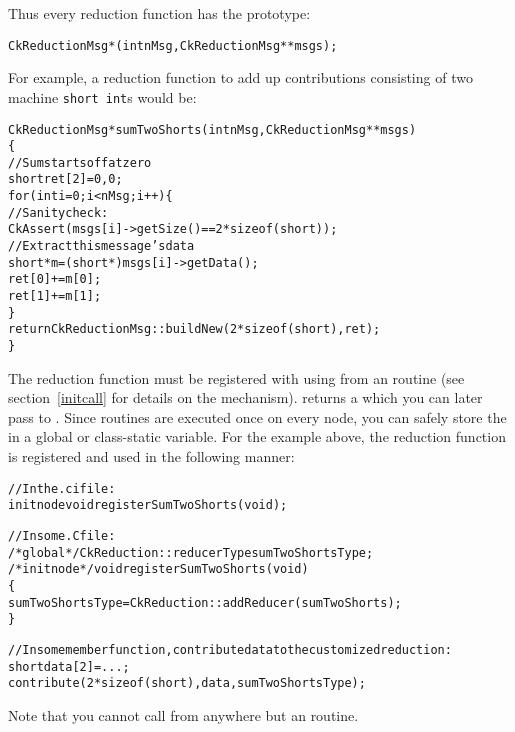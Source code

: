 Thus every reduction function has the prototype:
\begin{alltt}
CkReductionMsg *(int nMsg,CkReductionMsg **msgs);
\end{alltt}

For example, a reduction function to add up contributions 
consisting of two machine {\tt short int}s would be:

\begin{alltt}
CkReductionMsg *sumTwoShorts(int nMsg,CkReductionMsg **msgs)
\{
  //Sum starts off at zero
  short ret[2]={0,0};
  for (int i=0;i<nMsg;i++) \{
    //Sanity check:
    CkAssert(msgs[i]->getSize()==2*sizeof(short));
    //Extract this message's data
    short *m=(short *)msgs[i]->getData();
    ret[0]+=m[0];
    ret[1]+=m[1];
  \}
  return CkReductionMsg::buildNew(2*sizeof(short),ret);
\}
\end{alltt}

The reduction function must be registered with \charmpp{} 
using  from
an  routine (see section~\ref{initcall} for details
on the  mechanism).   
returns a  which you can later 
pass to .  Since  routines are executed
once on every node, you can safely store the 
in a global or class-static variable.  For the example above, the reduction
function is registered and used in the following manner:

\begin{alltt}
//In the .ci file:
  initnode void registerSumTwoShorts(void);

//In some .C file:
/*global*/ CkReduction::reducerType sumTwoShortsType;
/*initnode*/ void registerSumTwoShorts(void)
\{
  sumTwoShortsType=CkReduction::addReducer(sumTwoShorts);
\}

//In some member function, contribute data to the customized reduction:
  short data[2]=...;
  contribute(2*sizeof(short),data,sumTwoShortsType);
\end{alltt}

Note that you cannot call 
from anywhere but an  routine.


